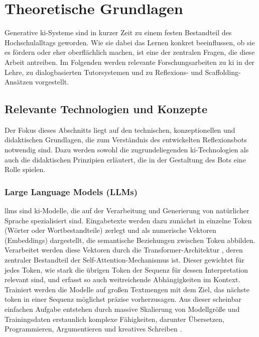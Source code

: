 \chapter{Theoretische Grundlagen}
\label{chap:theogrundlage}

Generative \acrshort{ki}-Systeme sind in kurzer Zeit zu einem festen Bestandteil des Hochschulalltags geworden.
Wie sie dabei das Lernen konkret beeinflussen, ob sie es fördern oder eher oberflächlich machen,
ist eine der zentralen Fragen, die diese Arbeit antreiben.
Im Folgenden werden relevante Forschungsarbeiten zu \gls{ki} in der Lehre, zu dialogbasierten
Tutorsystemen und zu Reflexions- und Scaffolding-Ansätzen vorgestellt.

\section{Relevante Technologien und Konzepte}
\label{sec:relevante-technologien-und-konzepte}

Der Fokus dieses Abschnitts liegt auf den technischen, konzeptionellen und didaktischen Grundlagen,
die zum Verständnis des entwickelten Reflexionsbots notwendig sind. Dazu werden sowohl die
zugrundeliegenden \acrshort{ki}-Technologien als auch die didaktischen Prinzipien erläutert, die in der 
Gestaltung des Bots eine Rolle spielen.

\subsection{Large Language Models (LLMs)}
\glspl{llm} sind \acrshort{ki}-Modelle, die auf der Verarbeitung und Generierung
von natürlicher Sprache spezialisiert sind. Eingabetexte werden dazu zunächst in einzelne Token
(Wörter oder Wortbestandteile) zerlegt und als numerische Vektoren (Embeddings) dargestellt, die
semantische Beziehungen zwischen Token abbilden. Verarbeitet werden diese Vektoren durch die
Transformer-Architektur \cite{vaswaniAttentionAllYou2023}, deren zentraler Bestandteil der
Self-Attention-Mechanismus ist. Dieser gewichtet für jedes Token, wie stark die übrigen Token der Sequenz
für dessen Interpretation relevant sind, und erfasst so auch weitreichende Abhängigkeiten im Kontext.
Trainiert werden die Modelle auf großen Textmengen mit dem Ziel,
das nächste \acrshort{token} in einer Sequenz möglichst präzise vorherzusagen.
Aus dieser scheinbar einfachen Aufgabe entstehen durch massive Skalierung von Modellgröße 
und Trainingsdaten erstaunlich komplexe Fähigkeiten, darunter Übersetzen, Programmieren, 
Argumentieren und kreatives Schreiben \cite{brownLanguageModelsAre2020, weiEmergentAbilitiesLarge2022}.


